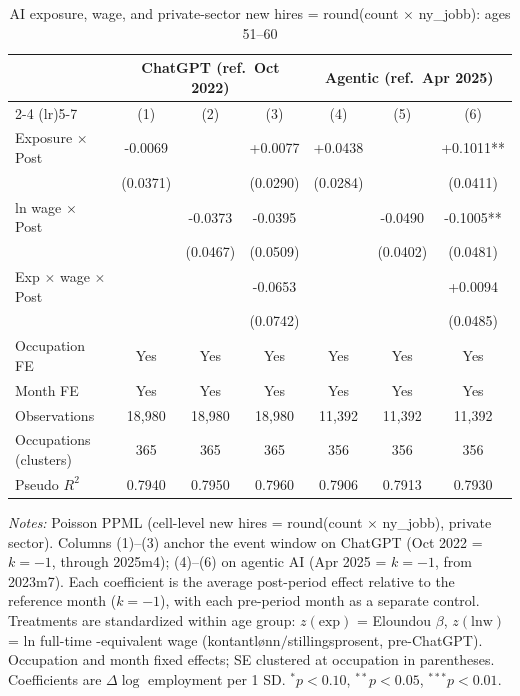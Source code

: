 \begin{table}[htbp]\centering
\caption{AI exposure, wage, and private-sector new hires = round(count $\times$ ny\_jobb): ages 51–60}
\label{tab:ca_did_age4}
\small
\begin{tabular}{lcccccc}
\toprule
 & \multicolumn{3}{c}{ChatGPT (ref.\ Oct 2022)} & \multicolumn{3}{c}{Agentic (ref.\ Apr 2025)} \\
\cmidrule(lr){2-4} \cmidrule(lr){5-7}
 & (1) & (2) & (3) & (4) & (5) & (6) \\
\midrule
Exposure $\times$ Post & -0.0069 &  & +0.0077 & +0.0438 &  & +0.1011** \\
 & (0.0371) &  & (0.0290) & (0.0284) &  & (0.0411) \\
ln wage $\times$ Post &  & -0.0373 & -0.0395 &  & -0.0490 & -0.1005** \\
 &  & (0.0467) & (0.0509) &  & (0.0402) & (0.0481) \\
Exp $\times$ wage $\times$ Post &  &  & -0.0653 &  &  & +0.0094 \\
 &  &  & (0.0742) &  &  & (0.0485) \\
\midrule
Occupation FE & Yes & Yes & Yes & Yes & Yes & Yes \\
Month FE & Yes & Yes & Yes & Yes & Yes & Yes \\
Observations & 18,980 & 18,980 & 18,980 & 11,392 & 11,392 & 11,392 \\
Occupations (clusters) & 365 & 365 & 365 & 356 & 356 & 356 \\
Pseudo $R^2$ & 0.7940 & 0.7950 & 0.7960 & 0.7906 & 0.7913 & 0.7930 \\
\bottomrule
\end{tabular}
\begin{minipage}{\linewidth}\vspace{2pt}\footnotesize
\emph{Notes:} Poisson PPML (cell-level new hires = round(count $\times$ ny\_jobb), private sector). Columns (1)--(3) anchor the event window on ChatGPT (Oct 2022 = $k{=}{-}1$, through 2025m4); (4)--(6) on agentic AI (Apr 2025 = $k{=}{-}1$, from 2023m7). Each coefficient is the average post-period effect relative to the reference month ($k{=}{-}1$), with each pre-period month as a separate control. Treatments are standardized within age group: $z(\text{exp})$ = Eloundou $\beta$, $z(\text{lnw})$ = ln full-time -equivalent wage (kontantl\o nn$/$stillingsprosent, pre-ChatGPT). Occupation and month fixed effects; SE clustered at occupation in parentheses. Coefficients are $\Delta\log$ employment per 1 SD. $^{*}p<0.10$, $^{**}p<0.05$, $^{***}p<0.01$.
\end{minipage}
\end{table}